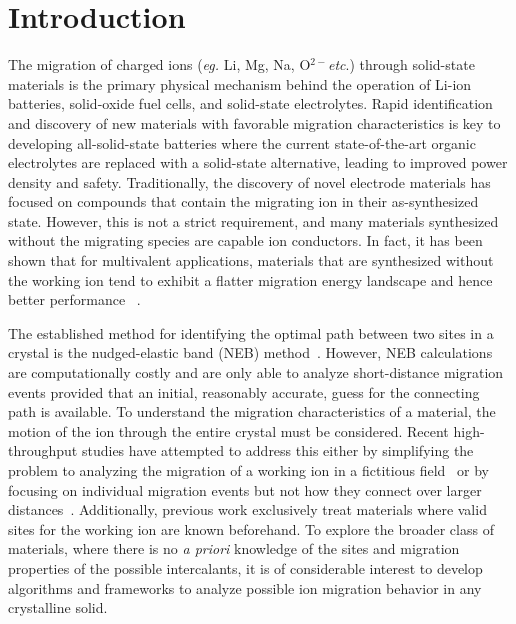 \documentclass[reprint,preprintnumbers,amsmath,amssymb,aps,prl]{revtex4-1}
\begin{document}
\section{Introduction}\label{sec:introduction}

The migration of charged ions ({\it eg.} Li, Mg, Na, O$^{2-}${\it etc}.) through solid-state materials is the primary physical mechanism behind the operation of Li-ion batteries, solid-oxide fuel cells, and solid-state electrolytes.
Rapid identification and discovery of new materials with favorable migration characteristics is key to developing all-solid-state batteries where the current state-of-the-art organic electrolytes are replaced with a solid-state alternative, leading to improved power density and safety.
Traditionally, the discovery of novel electrode materials has focused on compounds that contain the migrating ion in their as-synthesized state.
However, this is not a strict requirement, and many materials synthesized without the migrating species are capable ion conductors. 
In fact, it has been shown that for multivalent applications, materials that are synthesized without the working ion tend to exhibit a flatter migration energy landscape and hence better performance ~\cite{Kim2020Oct,Sun2016Jul,Rong2015Sep,Levi2010Jun}.

The established method for identifying the optimal path between two sites in a crystal is the nudged-elastic band (NEB)  method~\cite{Mills1994Feb,Jonsson1998Jun}.
However, NEB calculations are computationally costly and are only able to analyze short-distance migration events provided that an initial, reasonably accurate, guess for the connecting path is available.
To understand the migration characteristics of a material, the motion of the ion through the entire crystal must be considered. 
Recent high-throughput studies have attempted to address this either by simplifying the problem to analyzing the migration of a working ion in a fictitious field~\cite{Kahle2020Jan} or by focusing on individual migration events but not how they connect over larger distances~\cite{Bolle2020Jun}.
Additionally, previous work exclusively treat materials where valid sites for the working ion are known beforehand.
To explore the broader class of materials, where there is no {\it a priori} knowledge of the sites and migration properties of the possible intercalants, it is of considerable interest to develop algorithms and frameworks to analyze possible ion migration behavior in any crystalline solid. 
\end{document}
